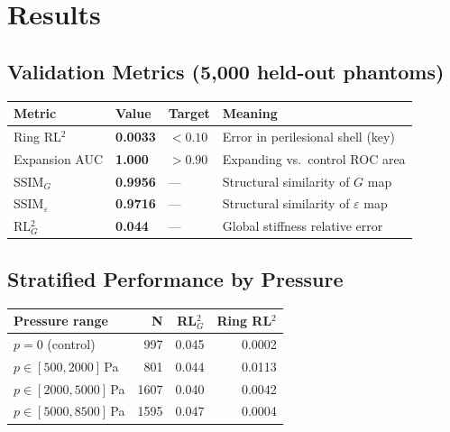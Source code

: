 \documentclass[11pt,letterpaper]{article}
\begin{document}
\section{Results}

\subsection{Validation Metrics (5,000 held-out phantoms)}

\begin{center}
\renewcommand{\arraystretch}{1.3}
\begin{tabular}{llll}
\toprule
Metric & Value & Target & Meaning \\
\midrule
Ring RL$^2$ & \textbf{0.0033} & $< 0.10$ & Error in perilesional shell (key) \\
Expansion AUC & \textbf{1.000} & $> 0.90$ & Expanding vs.\ control ROC area \\
SSIM$_G$ & \textbf{0.9956} & --- & Structural similarity of $G$ map \\
SSIM$_\varepsilon$ & \textbf{0.9716} & --- & Structural similarity of $\varepsilon$ map \\
RL$^2_G$ & \textbf{0.044} & --- & Global stiffness relative error \\
\bottomrule
\end{tabular}
\end{center}

\subsection{Stratified Performance by Pressure}

\begin{center}
\begin{tabular}{lrrr}
\toprule
Pressure range & N & RL$^2_G$ & Ring RL$^2$ \\
\midrule
$p = 0$ (control) & 997 & 0.045 & 0.0002 \\
$p \in [500, 2000]$\,Pa & 801 & 0.044 & 0.0113 \\
$p \in [2000, 5000]$\,Pa & 1607 & 0.040 & 0.0042 \\
$p \in [5000, 8500]$\,Pa & 1595 & 0.047 & 0.0004 \\
\bottomrule
\end{tabular}
\end{center}
\end{document}
